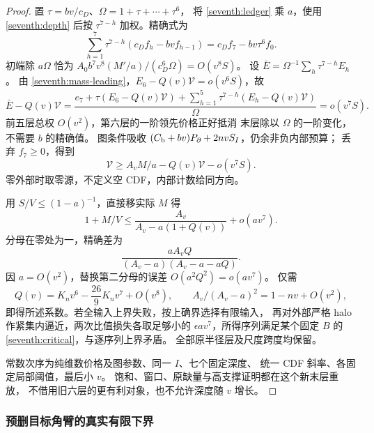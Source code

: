 \begin{proof}
置 \(\tau=bv/c_D\)、\(\Omega=1+\tau+\cdots+\tau^6\)，
将 \eqref{seventh:ledger} 乘 \(a\)，使用 \eqref{seventh:depth} 后按
\(\tau^{7-h}\) 加权。精确式为
\begin{equation}\label{seventh:telescope}
 \sum_{h=1}^7\tau^{7-h}(c_Df_h-bvf_{h-1})=c_Df_7-bv\tau^6f_0.
\end{equation}
初端除 \(a\Omega\) 恰为
\(A_0b^7v^8(M'/a)/(c_D^6\Omega)=O(v^8S)\)。
设 \(\bar E=\Omega^{-1}\sum_h\tau^{7-h}E_h\)。
由 \eqref{seventh:mass-leading}，\(E_6-Q(v)\mathcal V=o(v^6S)\)，故
\[
 \bar E-Q(v)\mathcal V=
 \frac{e_7+\tau(E_6-Q(v)\mathcal V)
 +\sum_{h=1}^5\tau^{7-h}(E_h-Q(v)\mathcal V)}{\Omega}
 =o(v^7S).
\]
前五层总权 \(O(v^2)\)，第六层的一阶领先价格正好抵消
末层除以 \(\Omega\) 的一阶变化，不需要 \(b\) 的精确值。
图条件吸收 \((C_{\rm b}+bv)P_\partial+2nvS_I\)，仍余非负内部预算；
丢弃 \(f_7\ge0\)，得到
\[
 \mathcal V\ge A_vM/a-Q(v)\mathcal V-o(v^7S).
\]
零外部时取零源，不定义空 CDF，内部计数给同方向。

用 \(S/V\le(1-a)^{-1}\)，直接移实际 \(M\) 得
\[
 1+M/V\le\frac{A_v}{A_v-a(1+Q(v))}+o(av^7).
\]
分母在零处为一，精确差为
\[
 \frac{aA_vQ}{(A_v-a)(A_v-a-aQ)}.
\]
因 \(a=O(v^2)\)，替换第二分母的误差 \(O(a^2Q^2)=o(av^7)\)。
仅需
\[
 Q(v)=K_nv^6-\frac{26}{9}K_nv^7+O(v^8),\qquad
 A_v/(A_v-a)^2=1-nv+O(v^2),
\]
即得所述系数。若全输入上界失败，按上确界选择有限输入，
再对外部严格 halo 作紧集内逼近，两次比值损失各取足够小的
\(\epsilon av^7\)，所得序列满足某个固定 \(B\) 的
\eqref{seventh:critical}，与逐序列上界矛盾。
全部原半径层及尺度跨度均保留。

常数次序为纯维数价格及图参数、同一 \(I\)、七个固定深度、
统一 CDF 斜率、各固定局部阈值，最后小 \(v\)。
饱和、窗口、原缺量与高支撑证明都在这个新末层重放，
不借用旧六层的更有利对象，也不允许深度随 \(v\) 增长。
\end{proof}

\subsubsection{预删目标角臂的真实有限下界}


